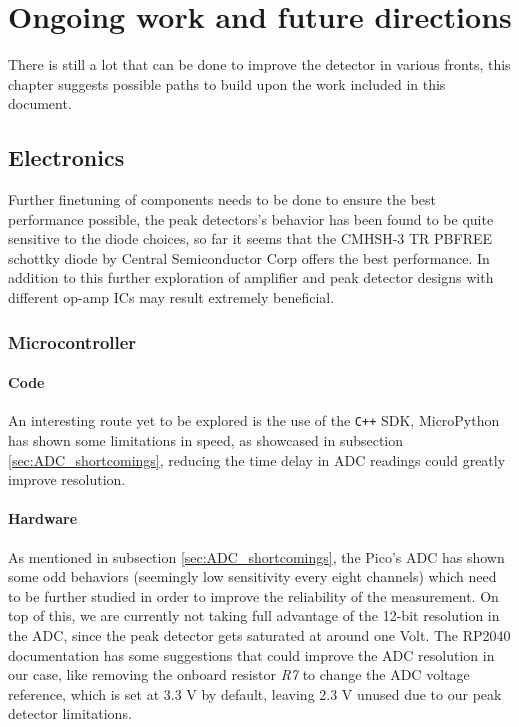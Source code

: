\chapter{Ongoing work and future directions}\label{chap:future}

There is still a lot that can be done to improve the detector in various fronts, this chapter suggests possible paths to build upon the work included in this document.

\section{Electronics}

Further finetuning of components needs to be done to ensure the best performance possible, the peak detectors's behavior has been found to be quite sensitive to the diode choices, so far it seems that the CMHSH-3 TR PBFREE schottky diode by Central Semiconductor Corp offers the best performance. In addition to this further exploration of amplifier and peak detector designs with different op-amp ICs may result extremely beneficial.

\subsection{Microcontroller}

\subsubsection{Code}

An interesting route yet to be explored is the use of the \texttt{C++} SDK, MicroPython has shown some limitations in speed, as showcased in subsection \ref{sec:ADC_shortcomings}, reducing the time delay in ADC readings could greatly improve resolution.

\subsubsection{Hardware}

As mentioned in subsection \ref{sec:ADC_shortcomings}, the Pico's ADC has shown some odd behaviors (seemingly low sensitivity every eight channels) which need to be further studied in order to improve the reliability of the measurement. On top of this, we are currently not taking full advantage of the 12-bit resolution in the ADC, since the peak detector gets saturated at around one Volt. The RP2040 documentation has some suggestions that could improve the ADC resolution \cite{datasheet2024RpPico} in our case, like removing the onboard resistor \textit{R7} to change the ADC voltage reference, which is set at 3.3 \unit{\V} by default, leaving 2.3 \unit{\V} unused due to our peak detector limitations.

